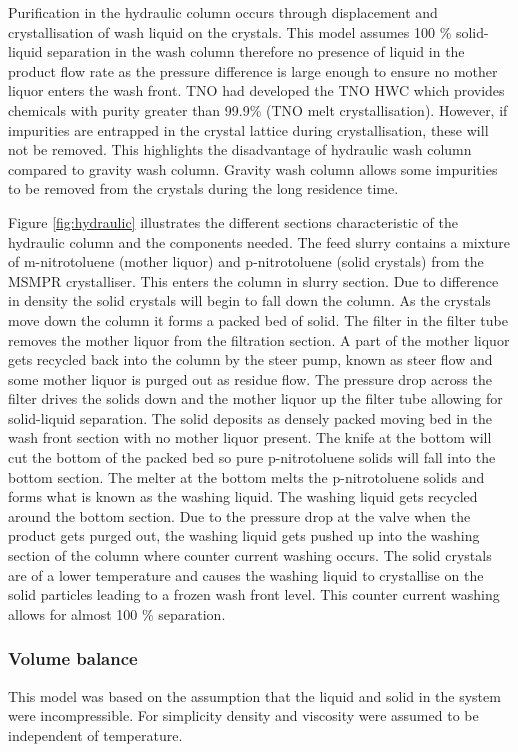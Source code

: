 Purification in the hydraulic column occurs through displacement and crystallisation of wash liquid on the crystals. This model assumes 100 \% solid-liquid separation in the wash column therefore no presence of liquid in the product flow rate as the pressure difference is large enough to ensure no mother liquor enters the wash front. TNO had developed the TNO HWC which provides chemicals with purity greater than 99.9\% (TNO melt crystallisation). However, if impurities are entrapped in the crystal lattice during crystallisation, these will not be removed. This highlights the disadvantage of hydraulic wash column compared to gravity wash column. Gravity wash column allows some impurities to be removed from the crystals during the long residence time. 

Figure \ref{fig:hydraulic} illustrates the different sections characteristic of the hydraulic column and the components needed. The feed slurry contains a mixture of m-nitrotoluene (mother liquor) and p-nitrotoluene (solid crystals) from the MSMPR crystalliser. This enters the column in slurry section. Due to difference in density the solid crystals will begin to fall down the column. As the crystals move down the column it forms a packed bed of solid. The filter in the filter tube removes the mother liquor from the filtration section. A part of the mother liquor gets recycled back into the column by the steer pump, known as steer flow and some mother liquor is purged out as residue flow. The pressure drop across the filter drives the solids down and the mother liquor up the filter tube allowing for solid-liquid separation. The solid deposits as densely packed moving bed in the wash front section with no mother liquor present. The knife at the bottom will cut the bottom of the packed bed so pure p-nitrotoluene solids will fall into the bottom section. The melter at the bottom melts the p-nitrotoluene solids and forms what is known as the washing liquid. The washing liquid gets recycled around the bottom section. Due to the pressure drop at the valve when the product gets purged out, the washing liquid gets pushed up into the washing section of the column where counter current washing occurs. The solid crystals are of a lower temperature and causes the washing liquid to crystallise on the solid particles leading to a frozen wash front level. This counter current washing allows for almost 100 \% separation. 

\subsubsection{Volume balance} 
This model was based on the assumption that the liquid and solid in the system were incompressible. For simplicity density and viscosity were assumed to be independent of temperature. 

